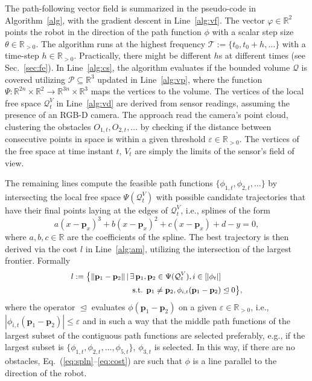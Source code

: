 \documentclass[lettersize,journal]{IEEEtran}
\theoremstyle{definition}
\begin{document}
The path-following vector field is summarized in the pseudo-code in Algorithm~\ref{alg}, with the gradient descent in Line~\ref{alg:vf}. The vector $\varphi\in\mathbb{R}^2$ points the robot in the direction of the path function $\phi$ with a scalar step size $\theta\in\mathbb{R}_{>0}$. The algorithm runs at the highest frequency $\mathcal{T}:=\{t_0,t_0+h,\dots\}$ with a time-step $h\in\mathbb{R}_{>0}$. Practically, there might be different $h$s at different times (see Sec.~\ref{sec:fe}). In Line~\ref{alg:cs}, the algorithm evaluates if the bounded volume $\mathcal{Q}$ is covered utilizing $\mathcal{P}\subseteq\mathbb{R}^3$ updated in Line~\ref{alg:vp}, where the function $\Psi:\mathbb{R}^{2n}\times\mathbb{R}^2\rightarrow\mathbb{R}^{3n}\times\mathbb{R}^3$ maps the vertices to the volume. The vertices of the local free space $\mathcal{Q}^V_t$ in Line~\ref{alg:vd} are derived from sensor readings, assuming the presence of an RGB-D camera. The %
approach read the camera's point cloud, clustering the obstacles $O_{1,t},O_{2,t},\dots$ by checking if the distance between consecutive points in space is within a given threshold $\varepsilon\in\mathbb{R}_{>0}$. The vertices of the free space at time instant $t$, $V_t$ are simply the limits of the sensor's field of view.

The remaining lines %
compute the feasible path functions $\{\phi_{1,t},\phi_{2,t},\dots\}$ by intersecting the local free space $\Psi(\mathcal{Q}^V_t)$ with possible candidate trajectories that have their final points laying at the edges of $\mathcal{Q}^V_t$, i.e., splines of the form
\begin{equation}\label{eq:spln}
  a(x-\mathbf{p}_x)^3+b(x-\mathbf{p}_x)^2+c(x-\mathbf{p}_x)+d-y=0,
\end{equation}
where $a,b,c\in\mathbb{R}$ are the coefficients of the spline. 
The best trajectory is then derived via the cost $l$ in Line~\ref{alg:am}, utilizing the intersection of the largest frontier. Formally
\begin{equation}\label{eq:cost}\small\begin{split} 
  l:=\bigl\{\lVert \mathbf{p}_1-\mathbf{p}_2\rVert\,|\,&\exists\,\mathbf{p}_1,\mathbf{p}_2\in\Psi(\mathcal{Q}_t^V),i\in[|\phi_t|]\\
  &\text{ s.t. }\mathbf{p}_1\neq\mathbf{p}_2,\phi_{i,t}(\mathbf{p}_1-\mathbf{p}_2)\trianglelefteq 0\bigr\},
\end{split}\end{equation}
where the operator $\trianglelefteq$ evaluates $\phi(\mathbf{p}_1-\mathbf{p}_2)$ on a given $\varepsilon\in\mathbb{R}_{>0}$, i.e., $|\phi_{i,t}(\mathbf{p}_1-\mathbf{p}_2)|\leq\varepsilon$ and in such a way that the middle path functions of the largest subset of the contiguous path functions are selected preferably, e.g., if the largest subset is $\{\phi_{1,t},\phi_{2,t},\dots,\phi_{5,t}\}$, $\phi_{3,t}$ is selected.
In this way, if there are no obstacles, Eq.~(\ref{eq:spln}--\ref{eq:cost}) are such that $\phi$ is a line parallel to the direction of the robot. 
\end{document}
